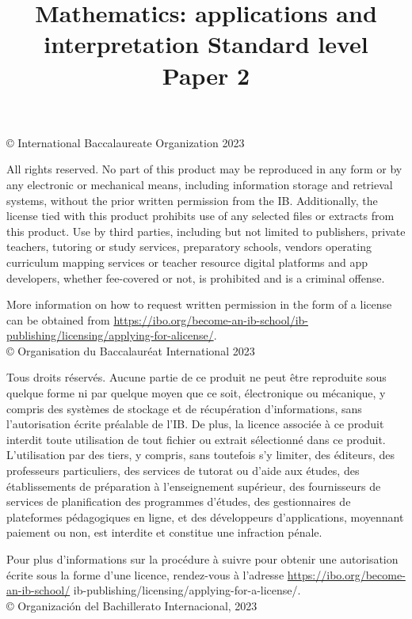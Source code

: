 \documentclass[10pt]{article}
\title{Mathematics: applications and interpretation Standard level \\
 Paper 2 }
\author{}
\date{}
\begin{document}
\maketitle
\captionsetup{singlelinecheck=false}
© International Baccalaureate Organization 2023

All rights reserved. No part of this product may be reproduced in any form or by any electronic or mechanical means, including information storage and retrieval systems, without the prior written permission from the IB. Additionally, the license tied with this product prohibits use of any selected files or extracts from this product. Use by third parties, including but not limited to publishers, private teachers, tutoring or study services, preparatory schools, vendors operating curriculum mapping services or teacher resource digital platforms and app developers, whether fee-covered or not, is prohibited and is a criminal offense.

More information on how to request written permission in the form of a license can be obtained from \href{https://ibo.org/become-an-ib-school/ib-publishing/licensing/applying-for-alicense/}{https://ibo.org/become-an-ib-school/ib-publishing/licensing/applying-for-alicense/}.\\
© Organisation du Baccalauréat International 2023

Tous droits réservés. Aucune partie de ce produit ne peut être reproduite sous quelque forme ni par quelque moyen que ce soit, électronique ou mécanique, y compris des systèmes de stockage et de récupération d'informations, sans l'autorisation écrite préalable de l'IB. De plus, la licence associée à ce produit interdit toute utilisation de tout fichier ou extrait sélectionné dans ce produit. L'utilisation par des tiers, y compris, sans toutefois s'y limiter, des éditeurs, des professeurs particuliers, des services de tutorat ou d'aide aux études, des établissements de préparation à l'enseignement supérieur, des fournisseurs de services de planification des programmes d'études, des gestionnaires de plateformes pédagogiques en ligne, et des développeurs d'applications, moyennant paiement ou non, est interdite et constitue une infraction pénale.

Pour plus d'informations sur la procédure à suivre pour obtenir une autorisation écrite sous la forme d'une licence, rendez-vous à l'adresse \href{https://ibo.org/become-an-ib-school/}{https://ibo.org/become-an-ib-school/} ib-publishing/licensing/applying-for-a-license/.\\
© Organización del Bachillerato Internacional, 2023
\end{document}

